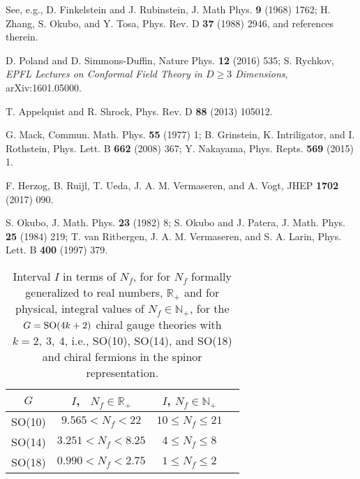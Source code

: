 \documentclass[prd,twocolumn,nofootinbib,amsfonts,amssymb]{revtex4}
\begin{document}
\begin{thebibliography}{99}
See, e.g., 
D. Finkelstein and J. Rubinstein, J. Math Phys. {\bf 9} (1968) 1762;
H. Zhang, S. Okubo, and Y. Tosa, Phys. Rev. D {\bf 37} (1988) 2946, 
and references therein.

%
D. Poland and D. Simmons-Duffin, 
Nature Phys. {\bf 12} (2016) 535; S. Rychkov, 
{\it EPFL Lectures on Conformal Field Theory in $D \ge 3$ Dimensions}, 
arXiv:1601.05000.

T. Appelquist and R. Shrock, Phys. Rev.  D {\bf 88} (2013) 105012. 

G. Mack, Commun. Math. Phys. {\bf 55} (1977) 1;
B. Grinstein, K. Intriligator, and I. Rothstein, Phys. Lett. B {\bf 662}
(2008) 367; Y. Nakayama, Phys. Repts. {\bf 569} (2015) 1.

F. Herzog, B. Ruijl, T. Ueda, J. A. M. Vermaseren, and A. Vogt,
JHEP {\bf 1702} (2017) 090. 

S. Okubo, J. Math. Phys. {\bf 23} (1982) 8; S. Okubo and J. Patera,
J. Math. Phys. {\bf 25} (1984) 219;
T. van Ritbergen, J. A. M. Vermaseren, and S. A. Larin, Phys. Lett. B
{\bf 400} (1997) 379.

\end{thebibliography}


\newpage


\begin{table}
  \caption{\footnotesize{Interval $I$ in terms of $N_f$, for 
for $N_f$ formally generalized to real numbers, ${\mathbb R}_+$ and for 
physical, integral values of $N_f \in {\mathbb N}_+$, 
    for the $G={\rm SO}(4k+2)$ chiral gauge theories with $k=2, \ 3, \ 4$, 
   i.e., SO(10), SO(14), and SO(18) and chiral fermions in the spinor
      representation.}}
\begin{center}
\begin{tabular}{|c||c|c|c|} \hline\hline
$G$ & $I$, \ $N_f \in {\mathbb R}_+$ & $I$, $N_f \in {\mathbb N}_+$ \\
\hline 
SO(10) & $9.565 < N_f < 22$ & $10 \le N_f \le 21$ \\
\hline
SO(14) & $3.251 < N_f < 8.25$ & $4 \le N_f \le 8$ \\
\hline
SO(18) & $0.990 < N_f < 2.75$ & $1 \le N_f \le 2$ \\
\hline\hline
\end{tabular}
\end{center}
\label{interval_so}
\end{table}
\end{document}
